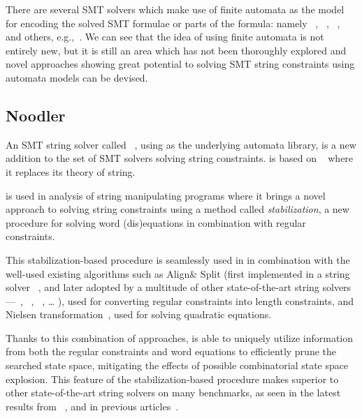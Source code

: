 There are several SMT solvers which make use of finite automata as the model for encoding the solved SMT formulae or parts of the formula: namely \ziiistriiire~\cite{Z3str3RE}, \trau~\cite{Trau}, \norn~\cite{Norn}, and others, e.g.,~\cite{AnthonyComplex2019}.
We can see that the idea of using finite automata is not entirely new, but it is still an area which has not been thoroughly explored and novel approaches showing great potential to solving SMT string constraints using automata models can be devised.

\subsection{Noodler}

An SMT string solver called \noodler~\cite{fm23_equations_synergy_regular_constraints_DBLP:conf/fm/BlahoudekCCHHLS23, oopsla23_stabilization_DBLP:journals/pacmpl/ChenCHHLS23,tacas24_noodler_10.1007/978-3-031-57246-3_2}, using \mata as the underlying automata library, is a new addition to the set of SMT solvers solving string constraints.
\noodler is based on \ziii~\cite{z3} where it replaces its theory of string.

\noodler is used in analysis of string manipulating programs where it brings a novel approach to solving string constraints using a method called \emph{stabilization}, a new procedure for solving word (dis)equations in combination with regular constraints.

This stabilization-based procedure is seamlessly used in \noodler in combination with the well-used existing algorithms such as
Align\& Split (first implemented in a string solver \norn~\cite{Norn,AutomataSplitting}, and later adopted by a multitude of other state-of-the-art string solvers---\ostrich~\cite{AnthonyTowards2016,AnthonyReplaceAll2018,AnthonyComplex2019,AnthonyRegex2022,AnthonyInteger2020},
\ziiistriiire~\cite{Z3str3RE,BerzishDGKMMN23}, \sloth~\cite{holik_string_2018}, \ldots
), used for converting regular constraints into length constraints, and
Nielsen transformation~\cite{nielsen1917}, used for solving quadratic equations.

Thanks to this combination of approaches, \noodler is able to uniquely utilize information from both the regular constraints and word equations to efficiently prune the searched state space, mitigating the effects of possible combinatorial state space explosion.
This feature of the stabilization-based procedure makes \noodler superior to other state-of-the-art string solvers on many benchmarks, as seen in the latest results from \noodler~\cite{tacas24_noodler_10.1007/978-3-031-57246-3_2}, and in previous articles~\cite{fm23_equations_synergy_regular_constraints_DBLP:conf/fm/BlahoudekCCHHLS23, oopsla23_stabilization_DBLP:journals/pacmpl/ChenCHHLS23}.

